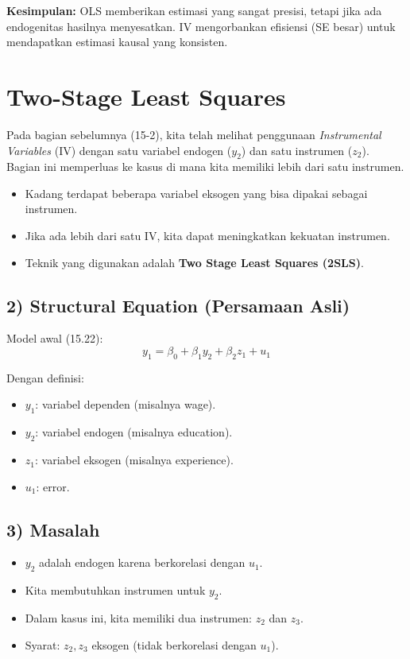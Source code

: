 \documentclass[]{article}
\begin{document}
\noindent
\textbf{Kesimpulan:}  
OLS memberikan estimasi yang sangat presisi, tetapi jika ada endogenitas hasilnya menyesatkan.  
IV mengorbankan efisiensi (SE besar) untuk mendapatkan estimasi kausal yang konsisten.



\section{Two-Stage Least Squares}
 
Pada bagian sebelumnya (15-2), kita telah melihat penggunaan \textit{Instrumental Variables} (IV) dengan satu variabel endogen ($y_2$) dan satu instrumen ($z_2$). 
Bagian ini memperluas ke kasus di mana kita memiliki lebih dari satu instrumen.

\begin{itemize}
    \item Kadang terdapat beberapa variabel eksogen yang bisa dipakai sebagai instrumen.
    \item Jika ada lebih dari satu IV, kita dapat meningkatkan kekuatan instrumen.
    \item Teknik yang digunakan adalah \textbf{Two Stage Least Squares (2SLS)}.
\end{itemize}

\subsection*{2) Structural Equation (Persamaan Asli)}
Model awal (15.22):
\[
y_1 = \beta_0 + \beta_1 y_2 + \beta_2 z_1 + u_1
\]

Dengan definisi:
\begin{itemize}
    \item $y_1$: variabel dependen (misalnya wage).
    \item $y_2$: variabel endogen (misalnya education).
    \item $z_1$: variabel eksogen (misalnya experience).
    \item $u_1$: error.
\end{itemize}

\subsection*{3) Masalah}
\begin{itemize}
    \item $y_2$ adalah endogen karena berkorelasi dengan $u_1$.
    \item Kita membutuhkan instrumen untuk $y_2$.
    \item Dalam kasus ini, kita memiliki dua instrumen: $z_2$ dan $z_3$.
    \item Syarat: $z_2, z_3$ eksogen (tidak berkorelasi dengan $u_1$).
\end{itemize}
\end{document}
